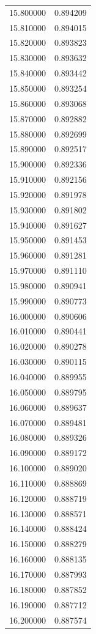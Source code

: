 \begin{tabular}{rr}
15.800000 & 0.894209 \\
15.810000 & 0.894015 \\
15.820000 & 0.893823 \\
15.830000 & 0.893632 \\
15.840000 & 0.893442 \\
15.850000 & 0.893254 \\
15.860000 & 0.893068 \\
15.870000 & 0.892882 \\
15.880000 & 0.892699 \\
15.890000 & 0.892517 \\
15.900000 & 0.892336 \\
15.910000 & 0.892156 \\
15.920000 & 0.891978 \\
15.930000 & 0.891802 \\
15.940000 & 0.891627 \\
15.950000 & 0.891453 \\
15.960000 & 0.891281 \\
15.970000 & 0.891110 \\
15.980000 & 0.890941 \\
15.990000 & 0.890773 \\
16.000000 & 0.890606 \\
16.010000 & 0.890441 \\
16.020000 & 0.890278 \\
16.030000 & 0.890115 \\
16.040000 & 0.889955 \\
16.050000 & 0.889795 \\
16.060000 & 0.889637 \\
16.070000 & 0.889481 \\
16.080000 & 0.889326 \\
16.090000 & 0.889172 \\
16.100000 & 0.889020 \\
16.110000 & 0.888869 \\
16.120000 & 0.888719 \\
16.130000 & 0.888571 \\
16.140000 & 0.888424 \\
16.150000 & 0.888279 \\
16.160000 & 0.888135 \\
16.170000 & 0.887993 \\
16.180000 & 0.887852 \\
16.190000 & 0.887712 \\
16.200000 & 0.887574 \\

\end{tabular}
